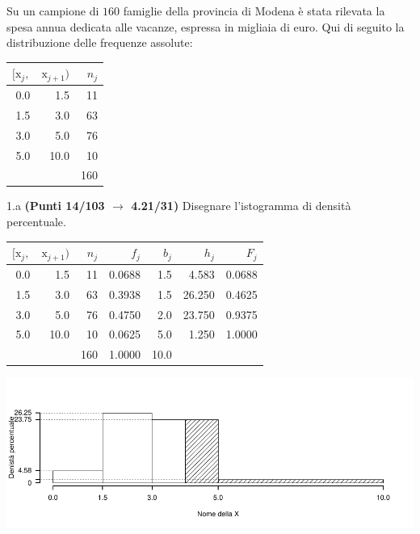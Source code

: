 \documentclass[
  11pt,
]{book}
\theoremstyle{mytheoremstyle}
\theoremstyle{mydefstyle}
\newenvironment{sol}
  {
  \begin{tcolorbox}[enhanced,breakable,arc=0.1mm,boxrule=1pt,colback=white,colframe=iblue,
  title=\bf \fontfamily{lmss}\selectfont \hspace{.5 cm} Soluzione,drop fuzzy shadow]

}{
\end{tcolorbox}
  }
\begin{document}
Su un campione di \(160\) famiglie della provincia di Modena è stata rilevata la spesa annua dedicata alle vacanze, espressa in migliaia di euro. Qui di seguito la distribuzione delle frequenze assolute:

\begin{table}[H]
\centering
\begin{tabular}{rrr}
\toprule
$[\text{x}_j,$ & $\text{x}_{j+1})$ & $n_j$\\
\midrule
0.0 & 1.5 & 11\\
1.5 & 3.0 & 63\\
3.0 & 5.0 & 76\\
5.0 & 10.0 & 10\\
 &  & 160\\
\bottomrule
\end{tabular}
\end{table}

1.a \textbf{(Punti 14/103 \(\rightarrow\) 4.21/31)} Disegnare l'istogramma di densità percentuale.

\begin{sol}

\begin{table}[H]
\centering
\begin{tabular}{rrrrrrr}
\toprule
$[\text{x}_j,$ & $\text{x}_{j+1})$ & $n_j$ & $f_j$ & $b_j$ & $h_j$ & $F_j$\\
\midrule
0.0 & 1.5 & 11 & 0.0688 & 1.5 & 4.583 & 0.0688\\
1.5 & 3.0 & 63 & 0.3938 & 1.5 & 26.250 & 0.4625\\
3.0 & 5.0 & 76 & 0.4750 & 2.0 & 23.750 & 0.9375\\
5.0 & 10.0 & 10 & 0.0625 & 5.0 & 1.250 & 1.0000\\
 &  & 160 & 1.0000 & 10.0 &  & \\
\bottomrule
\end{tabular}
\end{table}

\begin{center}\includegraphics{Esami_passati_con_soluzioni_files/figure-latex/2023-165-1} \end{center}

\end{sol}
\end{document}
